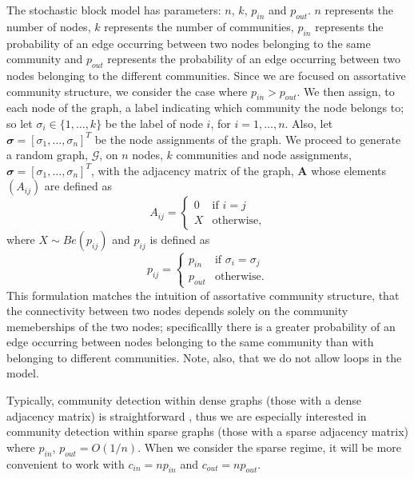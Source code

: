 \documentclass[12pt]{article}
\numberwithin{equation}{section}
\begin{document}
The stochastic block model has parameters: $n$, $k$, $p_{in}$ and $p_{out}$. $n$ represents the number of nodes, $k$ represents the number of communities, $p_{in}$ represents the probability of an edge occurring between two nodes belonging to the same community and $p_{out}$ represents the probability of an edge occurring between two nodes belonging to the different communities. Since we are focused on assortative community structure, we consider the case where $p_{in} > p_{out}$. We then assign, to each node of the graph, a label indicating which community the node belongs to; so let $\sigma_{i} \in \{1,\dots,k\}$ be the label of node $i$, for $i = 1,\dots,n$. Also, let $\mathbfit{\sigma} = [\sigma_{1},\dots,\sigma_{n}]^{T}$ be the node assignments of the graph. We proceed to generate a random graph, $\mathcal{G}$, on $n$ nodes, $k$ communities and node assignments, $\mathbfit{\sigma} = [\sigma_{1},\dots,\sigma_{n}]^{T}$, with the adjacency matrix of the graph, $\mathbf{A}$ whose elements $(A_{ij})$ are defined as
\begin{equation}
	A_{ij} =
	\begin{cases}
		0 & \text{if } i = j\\
		X & \text{otherwise},
	\end{cases}
\end{equation}
where $X \sim Be(p_{ij})$ and {$p_{ij}$} is defined as
\begin{equation}
	p_{ij} =
	\begin{cases}
		p_{in} & \text{if } \sigma_{i} = \sigma_{j}\\
		p_{out} & \text{otherwise}.
	\end{cases}
\end{equation}
This formulation matches the intuition of assortative community structure, that the connectivity between two nodes depends solely on the community memeberships of the two nodes; specificallly there is a greater probability of an edge occurring between nodes belonging to the same community than with belonging to different communities. Note, also, that we do not allow loops in the model.

Typically, community detection within dense graphs (those with a dense adjacency matrix) is straightforward \cite{DKM+13}, thus we are especially interested in community detection within sparse graphs (those with a sparse adjacency matrix) where $p_{in}$, $p_{out} = O(1/n)$. When we consider the sparse regime, it will be more convenient to work with $c_{in} = np_{in}$ and $c_{out} = np_{out}$.
\end{document}
